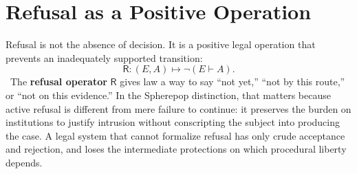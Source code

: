 
\chapter{Refusal as a Positive Operation}
\label{ch:ch043}

Refusal is not the absence of decision. It is a positive legal operation that prevents an inadequately supported transition:
\[
\mathsf R:(E,A)\mapsto \neg(E\vdash A).
\]
\Definition\ The \textbf{refusal operator} \(\mathsf R\) gives law a way to say ``not yet,'' ``not by this route,'' or ``not on this evidence.''
In the Spherepop distinction, that matters because active refusal is different from mere failure to continue: it preserves the burden on institutions to justify intrusion without conscripting the subject into producing the case. A legal system that cannot formalize refusal has only crude acceptance and rejection, and loses the intermediate protections on which procedural liberty depends.
